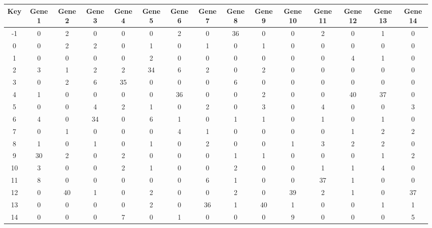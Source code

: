 \begin{tabular}{|c|c|c|c|c|c|c|c|c|c|c|c|c|c|c|}
\hline
Key & Gene 1 & Gene 2 & Gene 3 & Gene 4 & Gene 5 & Gene 6 & Gene 7 & Gene 8 & Gene 9 & Gene 10 & Gene 11 & Gene 12 & Gene 13 & Gene 14 \\
\hline
-1 & 0 & 2 & 0 & 0 & 0 & 2 & 0 & 36 & 0 & 0 & 2 & 0 & 1 & 0 \\
0 & 0 & 2 & 2 & 0 & 1 & 0 & 1 & 0 & 1 & 0 & 0 & 0 & 0 & 0 \\
1 & 0 & 0 & 0 & 0 & 2 & 0 & 0 & 0 & 0 & 0 & 0 & 4 & 1 & 0 \\
2 & 3 & 1 & 2 & 2 & 34 & 6 & 2 & 0 & 2 & 0 & 0 & 0 & 0 & 0 \\
3 & 0 & 2 & 6 & 35 & 0 & 0 & 0 & 6 & 0 & 0 & 0 & 0 & 0 & 0 \\
4 & 1 & 0 & 0 & 0 & 0 & 36 & 0 & 0 & 2 & 0 & 0 & 40 & 37 & 0 \\
5 & 0 & 0 & 4 & 2 & 1 & 0 & 2 & 0 & 3 & 0 & 4 & 0 & 0 & 3 \\
6 & 4 & 0 & 34 & 0 & 6 & 1 & 0 & 1 & 1 & 0 & 1 & 0 & 1 & 0 \\
7 & 0 & 1 & 0 & 0 & 0 & 4 & 1 & 0 & 0 & 0 & 0 & 1 & 2 & 2 \\
8 & 1 & 0 & 1 & 0 & 1 & 0 & 2 & 0 & 0 & 1 & 3 & 2 & 2 & 0 \\
9 & 30 & 2 & 0 & 2 & 0 & 0 & 0 & 1 & 1 & 0 & 0 & 0 & 1 & 2 \\
10 & 3 & 0 & 0 & 2 & 1 & 0 & 0 & 2 & 0 & 0 & 1 & 1 & 4 & 0 \\
11 & 8 & 0 & 0 & 0 & 0 & 0 & 6 & 1 & 0 & 0 & 37 & 1 & 0 & 0 \\
12 & 0 & 40 & 1 & 0 & 2 & 0 & 0 & 2 & 0 & 39 & 2 & 1 & 0 & 37 \\
13 & 0 & 0 & 0 & 0 & 2 & 0 & 36 & 1 & 40 & 1 & 0 & 0 & 1 & 1 \\
14 & 0 & 0 & 0 & 7 & 0 & 1 & 0 & 0 & 0 & 9 & 0 & 0 & 0 & 5 \\
\hline
\end{tabular}